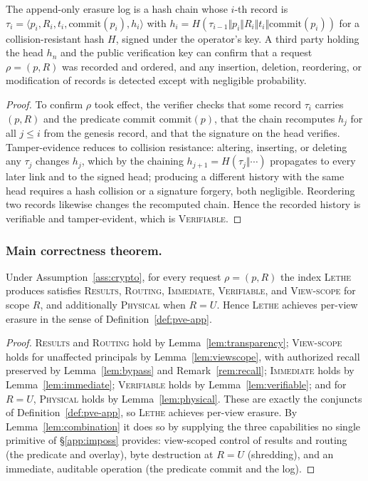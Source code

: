 \documentclass[sigconf, nonacm, review]{acmart}
\begin{document}
\begin{lemma}
\label{lem:verifiable}
The append-only erasure log is a hash chain whose $i$-th record is
$\tau_i=\langle p_i,R_i,t_i,\mathrm{commit}(p_i),h_i\rangle$ with
$h_i=H(\tau_{i-1}\Vert p_i\Vert R_i\Vert t_i\Vert \mathrm{commit}(p_i))$ for a
collision-resistant hash $H$, signed under the operator's key. A third party
holding the head $h_n$ and the public verification key can confirm that a
request $\rho=(p,R)$ was recorded and ordered, and any insertion, deletion,
reordering, or modification of records is detected except with negligible
probability.
\end{lemma}
\begin{proof}
To confirm $\rho$ took effect, the verifier checks that some record
$\tau_i$ carries $(p,R)$ and the predicate commit $\mathrm{commit}(p)$, that
the chain recomputes $h_j$ for all $j\le i$ from the genesis record, and that
the signature on the head verifies. Tamper-evidence reduces to collision
resistance: altering, inserting, or deleting any $\tau_j$ changes $h_j$, which
by the chaining $h_{j+1}=H(\tau_j\Vert\cdots)$ propagates to every later link
and to the signed head; producing a different history with the same head
requires a hash collision or a signature forgery, both negligible. Reordering
two records likewise changes the recomputed chain. Hence the recorded history
is verifiable and tamper-evident, which is \textsc{Verifiable}.
\end{proof}

\subsubsection{Main correctness theorem.}
\label{app:correct-main}

\begin{theorem}
\label{thm:lethe}
Under Assumption~\ref{ass:crypto}, for every request $\rho=(p,R)$ the index
\textsc{Lethe} produces satisfies \textsc{Results}, \textsc{Routing},
\textsc{Immediate}, \textsc{Verifiable}, and \textsc{View-scope} for scope
$R$, and additionally \textsc{Physical} when $R=U$. Hence \textsc{Lethe}
achieves per-view erasure in the sense of Definition~\ref{def:pve-app}.
\end{theorem}
\begin{proof}
\textsc{Results} and \textsc{Routing} hold by Lemma~\ref{lem:transparency};
\textsc{View-scope} holds for unaffected principals by
Lemma~\ref{lem:viewscope}, with authorized recall preserved by
Lemma~\ref{lem:bypass} and Remark~\ref{rem:recall}; \textsc{Immediate} holds by
Lemma~\ref{lem:immediate}; \textsc{Verifiable} holds by
Lemma~\ref{lem:verifiable}; and for $R=U$, \textsc{Physical} holds by
Lemma~\ref{lem:physical}. These are exactly the conjuncts of
Definition~\ref{def:pve-app}, so \textsc{Lethe} achieves per-view erasure. By
Lemma~\ref{lem:combination} it does so by supplying the three capabilities no
single primitive of \S\ref{app:imposs} provides: view-scoped control of
results and routing (the predicate and overlay), byte destruction at $R=U$
(shredding), and an immediate, auditable operation (the predicate commit and
the log).
\end{proof}
\end{document}
